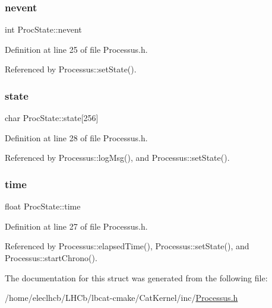 \mbox{\label{structProcState_a1881d6b0db849a8af15f586ad5959260}} 
\subsubsection{\texorpdfstring{nevent}{nevent}}
{\footnotesize\ttfamily int Proc\+State\+::nevent}



Definition at line 25 of file Processus.\+h.



Referenced by Processus\+::set\+State().

\mbox{\label{structProcState_aaffb70e5af437e2c0d4dfc69bd0b24cd}} 
\subsubsection{\texorpdfstring{state}{state}}
{\footnotesize\ttfamily char Proc\+State\+::state\mbox{[}256\mbox{]}}



Definition at line 28 of file Processus.\+h.



Referenced by Processus\+::log\+Msg(), and Processus\+::set\+State().

\mbox{\label{structProcState_a88c69b099d8f2b2164d478f28e87610f}} 
\subsubsection{\texorpdfstring{time}{time}}
{\footnotesize\ttfamily float Proc\+State\+::time}



Definition at line 27 of file Processus.\+h.



Referenced by Processus\+::elapsed\+Time(), Processus\+::set\+State(), and Processus\+::start\+Chrono().



The documentation for this struct was generated from the following file\+:\begin{DoxyCompactItemize}
\item 
/home/eleclhcb/\+L\+H\+Cb/lbcat-\/cmake/\+Cat\+Kernel/inc/\hyperlink{Processus_8h}{Processus.\+h}\end{DoxyCompactItemize}
